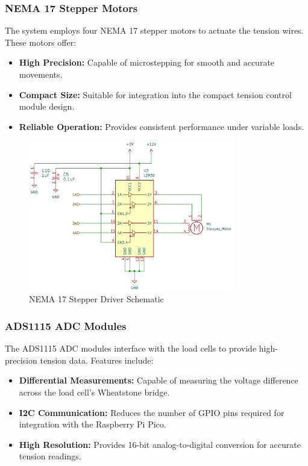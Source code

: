\subsubsection{NEMA 17 Stepper Motors}
The system employs four NEMA 17 stepper motors to actuate the tension wires. These motors offer:
\begin{itemize}
    \item \textbf{High Precision:} Capable of microstepping for smooth and accurate movements.
    \item \textbf{Compact Size:} Suitable for integration into the compact tension control module design.
    \item \textbf{Reliable Operation:} Provides consistent performance under variable loads.
\end{itemize}

\begin{figure}[H]
    \centering
    \includegraphics[width=0.8\textwidth]{images/Stepper.png}
    \caption{NEMA 17 Stepper Driver Schematic}
    \label{fig:Stepper}
\end{figure}

\subsubsection{ADS1115 ADC Modules}
The ADS1115 ADC modules interface with the load cells to provide high-precision tension data. Features include:
\begin{itemize}
    \item \textbf{Differential Measurements:} Capable of measuring the voltage difference across the load cell's Wheatstone bridge.
    \item \textbf{I2C Communication:} Reduces the number of GPIO pins required for integration with the Raspberry Pi Pico.
    \item \textbf{High Resolution:} Provides 16-bit analog-to-digital conversion for accurate tension readings.
\end{itemize}

